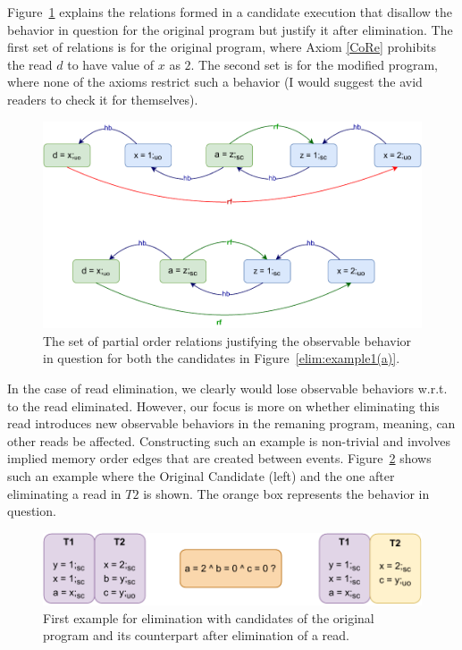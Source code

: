     Figure~\ref{elim:example1(b)} explains the relations formed in a candidate execution that disallow the behavior in question for the original program but justify it after elimination. 
    The first set of relations is for the original program, where Axiom \ref{CoRe} prohibits the read $d$ to have value of $x$ as $2$.
    The second set is for the modified program, where none of the axioms restrict such a behavior (I would suggest the avid readers to check it for themselves).
    \begin{figure}[H]
        \centering
        \includegraphics[scale=0.7]{5.Elimination/EliminationExample1(b).pdf}
        \caption{The set of partial order relations justifying the observable behavior in question for both the candidates in Figure~\ref{elim:example1(a)}.} 
        \label{elim:example1(b)}
    \end{figure}

    In the case of read elimination, we clearly would lose observable behaviors w.r.t. to the read eliminated.
    However, our focus is more on whether eliminating this read introduces new observable behaviors in the remaning program, meaning, can other reads be affected.
    Constructing such an example is non-trivial and involves implied memory order edges that are created between events.
    Figure~\ref{elim:example2(a)} shows such an example where the Original Candidate (left) and the one after eliminating a read in $T2$ is shown.
    The orange box represents the behavior in question. 
    \begin{figure}[H]
        \centering
        \includegraphics[scale=0.7]{5.Elimination/EliminationExample2(a).pdf}
        \caption{First example for elimination with candidates of the original program and its counterpart after elimination of a read.} 
        \label{elim:example2(a)}
    \end{figure}

